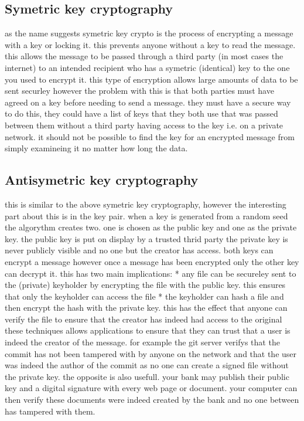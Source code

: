 \documentclass[12pt]{article}
\begin{document}
\subsection{Symetric key cryptography}
as the name suggests symetric key crypto is the process of encrypting a
message with a key or locking it. this prevents anyone without a key to
read the message. this allows the message to be passed through a third
party (in most cases the internet) to an intended recipient who has a
symetric (identical) key to the one you used to encrypt it. this type
of encryption allows large amounts of data to be sent securley however
the problem with this is that both parties must have agreed on a key before
needing to send a message. they must have a secure way to do this, they
could have a list of keys that they both use that was passed between
them without a third party having access to the key i.e. on a private
network. it should not be possible to find the key for an encrypted
message from simply examineing it no matter how long the data.

\subsection{Antisymetric key cryptography}
this is similar to the above symetric key cryptography, however the
interesting part about this is in the key pair. when a key is generated
from a random seed the algorythm creates two. one is chosen as the public
key and one as the private key. the public key is put on display by a
trusted thrid party the private key is never publicly visible and no one
but the creator has access. both keys can encrypt a message however
once a message has been encrypted only the other key can decrypt it.
this has two main implications:
  *  any file can be secureley sent to the (private) keyholder by
     encrypting the file with the public key. this ensures that
     only the keyholder can access the file
  *  the keyholder can hash a file and then encrypt the hash with the
     private key. this has the effect that anyone can verify the file
     to ensure that the creator has indeed had access to the original
these techniques allows applications to ensure that they can trust that
a user is indeed the creator of the message. for example the git server
verifys that the commit has not been tampered with by anyone on the network
and that the user was indeed the author of the commit as no one can create
a signed file without the private key.
the opposite is also usefull. your bank may publish their public key and
a digital signature with every web page or document. your computer can then
verify these documents were indeed created by the bank and no one between
has tampered with them.
\end{document}
